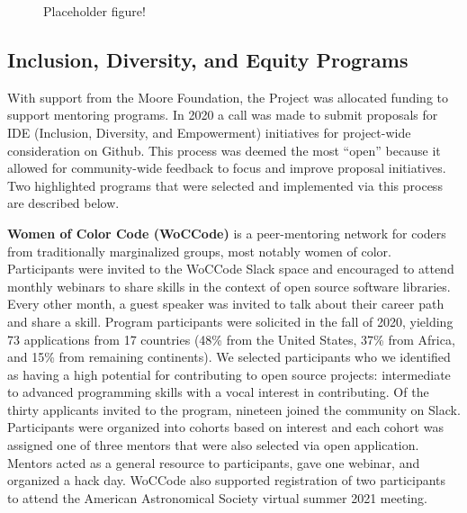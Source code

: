\documentclass[modern]{aastex631}
\newcommand{\secauthor}[1]{{\color{blue}Author:~\textit{#1}}}
\begin{document}
\begin{figure}
    \begin{centering}
        \caption{Placeholder figure!}
        \label{fig:contributor-summary}
    \end{centering}
\end{figure}


\subsection{Inclusion, Diversity, and Equity Programs} \label{sec:project-ide}


With support from the Moore Foundation, the \astropy Project was
allocated funding to support mentoring programs. In 2020 a call was
made to submit proposals for IDE (Inclusion, Diversity, and
Empowerment) initiatives for project-wide consideration on
Github. This process was deemed the most ``open'' because it allowed
for community-wide feedback to focus and improve proposal
initiatives. Two highlighted programs that were selected and implemented via
this process are described below.


\textbf{Women of Color Code (WoCCode)} is a peer-mentoring network for
coders from traditionally marginalized groups, most notably women of
color. Participants were invited to the WoCCode Slack space and
encouraged to attend monthly webinars to share skills in the context
of open source software libraries. Every other month, a guest speaker
was invited to talk about their career path and share a skill. Program
participants were solicited in the fall of 2020, yielding 73
applications from 17 countries (48\% from the United States, 37\% from
Africa, and 15\% from remaining continents). We selected participants
who we identified as having a high potential for contributing to open
source projects: intermediate to advanced programming skills with a
vocal interest in contributing. Of the thirty applicants invited to
the program, nineteen joined the community on Slack. Participants were
organized into cohorts based on interest and each cohort was assigned
one of three mentors that were also selected via open
application. Mentors acted as a general resource to participants, gave
one webinar, and organized a hack day. WoCCode also supported
registration of two participants to attend the American Astronomical
Society virtual summer 2021 meeting.
\end{document}
